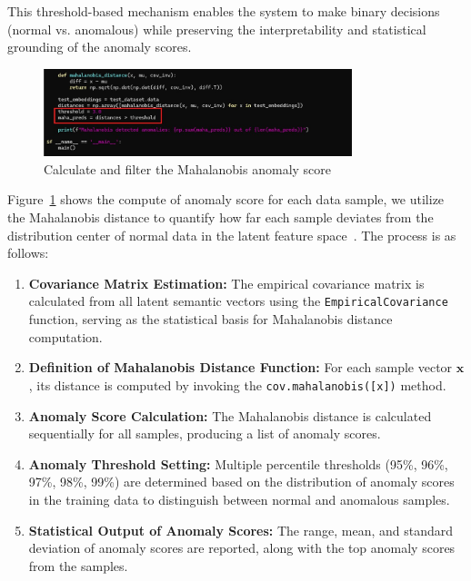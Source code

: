 \begin{ZhChapter}
    This threshold-based mechanism enables the system to make binary decisions (normal vs. anomalous) while preserving the interpretability and statistical grounding of the anomaly scores.

    \begin{figure}[htbp]
        \centering
        \includegraphics[width = 0.8\textwidth]{image/AnomalyScore.jpg}
        \caption{Calculate and filter the Mahalanobis anomaly score}
        \label{fig:abc}
    \end{figure}


    Figure~\ref{fig:abc} shows the compute of anomaly score for each data sample, we utilize the Mahalanobis distance to quantify how far each sample deviates from the distribution center of normal data in the latent feature space~\cite{kamoi2020mahalanobis}. The process is as follows:

    \begin{enumerate}
        \item \textbf{Covariance Matrix Estimation:} The empirical covariance matrix is calculated from all latent semantic vectors using the \texttt{EmpiricalCovariance} function, serving as the statistical basis for Mahalanobis distance computation.

        \item \textbf{Definition of Mahalanobis Distance Function:} For each sample vector $\mathbf{x}$, its distance is computed by invoking the \texttt{cov.mahalanobis([x])} method.

        \item \textbf{Anomaly Score Calculation:} The Mahalanobis distance is calculated sequentially for all samples, producing a list of anomaly scores.

        \item \textbf{Anomaly Threshold Setting:} Multiple percentile thresholds (95\%, 96\%, 97\%, 98\%, 99\%) are determined based on the distribution of anomaly scores in the training data to distinguish between normal and anomalous samples.

        \item \textbf{Statistical Output of Anomaly Scores:} The range, mean, and standard deviation of anomaly scores are reported, along with the top anomaly scores from the samples.


\end{enumerate}
\end{ZhChapter}
